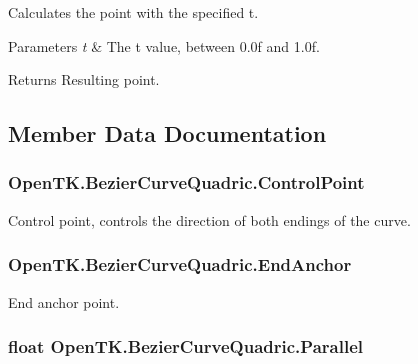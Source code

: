 Calculates the point with the specified t. 


\begin{DoxyParams}{Parameters}
{\em t} & The t value, between 0.\-0f and 1.\-0f.\\
\hline
\end{DoxyParams}
\begin{DoxyReturn}{Returns}
Resulting point.
\end{DoxyReturn}


\subsection{Member Data Documentation}
\hypertarget{struct_open_t_k_1_1_bezier_curve_quadric_acf1d9d62b041dadefa2665f076165be9}{
\subsubsection[{Control\-Point}]{ Open\-T\-K.\-Bezier\-Curve\-Quadric.\-Control\-Point}}\label{struct_open_t_k_1_1_bezier_curve_quadric_acf1d9d62b041dadefa2665f076165be9}


Control point, controls the direction of both endings of the curve. 

\hypertarget{struct_open_t_k_1_1_bezier_curve_quadric_a176ff3e32ed4a3551ffdefdfce284cd2}{
\subsubsection[{End\-Anchor}]{ Open\-T\-K.\-Bezier\-Curve\-Quadric.\-End\-Anchor}}\label{struct_open_t_k_1_1_bezier_curve_quadric_a176ff3e32ed4a3551ffdefdfce284cd2}


End anchor point. 

\hypertarget{struct_open_t_k_1_1_bezier_curve_quadric_af8a445547da095c74c25ac8c393eccfd}{
\subsubsection[{Parallel}]{\setlength{\rightskip}{0pt plus 5cm}float Open\-T\-K.\-Bezier\-Curve\-Quadric.\-Parallel}}\label{struct_open_t_k_1_1_bezier_curve_quadric_af8a445547da095c74c25ac8c393eccfd}


